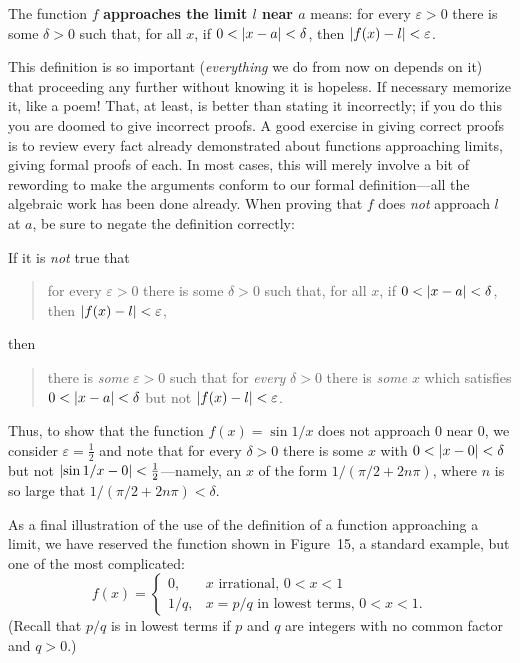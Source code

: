 \begin{spivakdefn}
The function $f$ \textbf{approaches the limit $l$ near $a$} means: for every
$\varepsilon>0$ there is some $\delta>0$ such that, for all $x$, if
$0<\lvert x-a\rvert<\delta$, then $\lvert f(x)-l\rvert<\varepsilon$.
\end{spivakdefn}

This definition is so important (\emph{everything} we do from now on depends
on it) that proceeding any further without knowing it is hopeless. If
necessary memorize it, like a poem! That, at least, is better than stating it
incorrectly; if you do this you are doomed to give incorrect proofs. A good
exercise in giving correct proofs is to review every fact already demonstrated
about functions approaching limits, giving formal proofs of each. In most
cases, this will merely involve a bit of rewording to make the arguments
conform to our formal definition---all the algebraic work has been done
already. When proving that $f$ does \emph{not} approach $l$ at $a$, be sure to
negate the definition correctly:

If it is \emph{not} true that
\begin{quote}
for every $\varepsilon>0$ there is some $\delta>0$ such that, for all $x$, if
$0<\lvert x-a\rvert<\delta$, then $\lvert f(x)-l\rvert<\varepsilon$,
\end{quote}
then
\begin{quote}
there is \emph{some} $\varepsilon>0$ such that for \emph{every} $\delta>0$
there is \emph{some} $x$ which satisfies $0<\lvert x-a\rvert<\delta$ but not
$\lvert f(x)-l\rvert<\varepsilon$.
\end{quote}

Thus, to show that the function $f(x)=\sin 1/x$ does not approach $0$ near
$0$, we consider $\varepsilon=\frac{1}{2}$ and note that for every
$\delta>0$ there is some $x$ with $0<\lvert x-0\rvert<\delta$ but not
$\lvert\sin 1/x-0\rvert<\frac{1}{2}$---namely, an $x$ of the form
$1/(\pi/2+2n\pi)$, where $n$ is so large that $1/(\pi/2+2n\pi)<\delta$.

As a final illustration of the use of the definition of a function approaching
a limit, we have reserved the function shown in Figure~15, a standard example,
but one of the most complicated:
\[
f(x)=\begin{cases}
0, & x\text{ irrational, }0<x<1\\
1/q, & x=p/q\text{ in lowest terms, }0<x<1.
\end{cases}
\]
(Recall that $p/q$ is in lowest terms if $p$ and $q$ are integers with no
common factor and $q>0$.)

